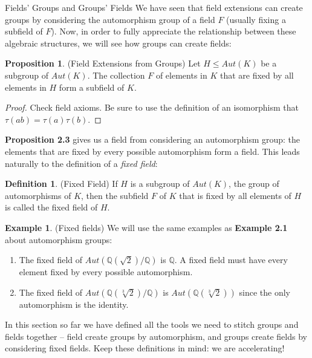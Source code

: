 \documentclass[12pt]{article}
\theoremstyle{definition}
\theoremstyle{definition}
\newtheorem{definition}{Definition}[section]
\theoremstyle{definition}
\newtheorem{example}{Example}[section]
\theoremstyle{definition}
\theoremstyle{definition}
\theoremstyle{definition}
\newtheorem{proposition}{Proposition}[section]
\theoremstyle{definition}
\begin{document}
\begin{section}{Fields' Groups and Groups' Fields}
    We have seen that field extensions can create groups by considering the automorphism group of a field \(F\) (usually fixing a subfield of \(F\)). Now, in order to fully appreciate the relationship between these 
    algebraic structures, we will see how groups can create fields:

    \begin{proposition}{(Field Extensions from Groups)}
        Let \(H \leq Aut(K)\) be a subgroup of \(Aut(K)\). The collection \(F\) of elements in \(K\) that are fixed by all elements in \(H\) form a subfield of \(K\).
        \begin{proof}
            Check field axioms. Be sure to use the definition of an isomorphism that \(\tau(ab) = \tau(a)\tau(b)\).
        \end{proof}
    \end{proposition}

    \textbf{Proposition 2.3} gives us a field from considering an automorphism group: the elements that are fixed by every possible automorphism form a field. This leads naturally to the definition of a 
    \textit{fixed field}:

    \begin{definition}{(Fixed Field)}
        If \(H\) is a subgroup of \(Aut(K)\), the group of automorphisms of \(K\), then the subfield \(F\) of \(K\) that is fixed by all elements of \(H\) is called the fixed field of \(H\).
    \end{definition}

    \begin{example}{(Fixed fields)}
        We will use the same examples as \textbf{Example 2.1} about automorphism groups:
        \begin{enumerate}
            \item The fixed field of \(Aut(\mathbb{Q}(\sqrt{2})/\mathbb{Q})\) is \(\mathbb{Q}\). A fixed field must have every element fixed by 
            every possible automorphism.
            \item The fixed field of \(Aut(\mathbb{Q}(\sqrt[3]{2})/\mathbb{Q})\) is \(Aut(\mathbb{Q}(\sqrt[3]{2}))\) since the only automorphism is the identity.
        \end{enumerate}
    \end{example}

    In this section so far we have defined all the tools we need to stitch groups and fields together -- field create groups by automorphism, and groups create fields by 
    considering fixed fields. Keep these definitions in mind: we are accelerating!
\end{section}
\end{document}
